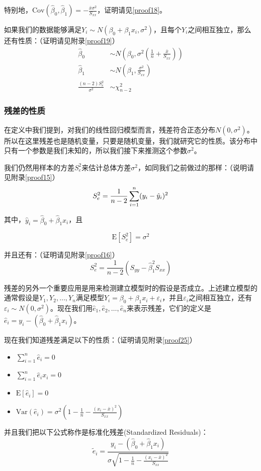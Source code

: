 \documentclass[UTF8]{ctexart}
\begin{document}
特别地，$\mathrm{Cov}(\hat\beta_0,\hat\beta_1)=-\frac{\bar x\sigma^2}{S_{xx}}$，证明请见\ref{proof18}。

如果我们的数据能够满足$Y_i\sim N(\beta_0+\beta_1x_i,\sigma^2)$，且每个$Y_i$之间相互独立，那么还有性质：（证明请见附录\ref{proof19}）
\begin{align*}
	\hat\beta_0&\sim N\left(\beta_0,\sigma^2\left(\frac{1}{n}+\frac{\bar x}{S_{xx}}\right)\right)\\
	\hat\beta_1&\sim N\left(\beta_1,\frac{\sigma^2}{S_{xx}}\right)\\
	\frac{(n-2)S_e^2}{\sigma^2}&\sim\chi_{n-2}^2
\end{align*}
\subsubsection{残差的性质}
在定义中我们提到，对我们的线性回归模型而言，残差符合正态分布$N(0,\sigma^2)$。所以在这里残差也是随机变量，只要是随机变量，我们就研究它的性质。该分布中只有一个参数是我们未知的，所以我们接下来推测这个参数$\sigma^2$。

我们仍然用样本的方差$S_e^2$来估计总体方差$\sigma^2$，如同我们之前做过的那样：（说明请见附录\ref{proof15}）
\[S_e^2=\frac{1}{n-2}\sum_{i=1}^n(y_i-\Hat{y}_i)^2\]

其中，$\hat y_i=\hat\beta_0+\hat\beta_1x_i$，且

\[
	\mathrm E[S_e^2]=\sigma^2
\]

并且还有：（证明请见附录\ref{proof16}）
\[
	S_e^2=\frac{1}{n-2}(S_{yy}-\hat\beta_1^2S_{xx})
\]

残差的另外一个重要应用是用来检测建立模型时的假设是否成立。上述建立模型的通常假设是$Y_1,Y_2,\dots,Y_n$满足模型$Y_i=\beta_0+\beta_1x_i+\varepsilon_i$，并且$\varepsilon_i$之间相互独立，还有$\varepsilon_i\sim N(0,\sigma^2)$。现在我们用$\hat e_1,\hat e_2,\dots,\hat e_n$来表示残差，它们的定义是$\hat e_i=y_i-(\hat\beta_0+\hat\beta_1x_i)$。

现在我们知道残差满足以下的性质：（证明请见附录\ref{proof25}）
\begin{itemize}
	\item $\sum_{i=1}^n\hat e_i=0$
	\item $\sum_{i=1}^n\hat e_ix_i=0$
	\item $\mathrm E[\hat e_i]=0$
	\item $\mathrm{Var}(\hat e_i)=\sigma^2\left(1-\frac{1}{n}-\frac{(x_i-\bar x)^2}{S_{xx}}\right)$
\end{itemize}

并且我们把以下公式称作是标准化残差(Standardized Residuals)：
\[
	\tilde e_i=\frac{y_i-(\hat\beta_0+\hat\beta_1x_i)}{\sigma\sqrt{1-\frac{1}{n}-\frac{(x_i-\bar x)^2}{S_{xx}}}}
\]
\end{document}
